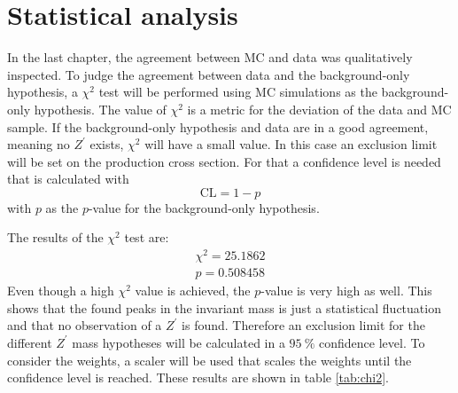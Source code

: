 \section{Statistical analysis}
In the last chapter, the agreement between MC and data was qualitatively inspected.
To judge the agreement between data and the background-only hypothesis, a $\chi^2$ test will be performed using MC simulations as the background-only hypothesis.
The value of $\chi^2$ is a metric for the deviation of the data and MC sample.
If the background-only hypothesis  and data are in a good agreement, meaning no $Z^\prime$ exists, $\chi^2$ will have a small value.
In this case an exclusion limit will be set on the production cross section.
For that a confidence level is needed that is calculated with
\begin{equation}
  \text{CL}= 1-p
\end{equation}
with $p$ as the $p$-value for the background-only hypothesis.

The results of the $\chi^2$ test are:
\begin{align*}
  \chi^2= 25.1862 \\
  p = 0.508458
\end{align*}
Even though a high $\chi^2$ value is achieved, the $p$-value is very high as well.
This shows that the found peaks in the invariant mass is just a statistical fluctuation and that no observation of a $Z^\prime$ is found.
Therefore an exclusion limit for the different $Z^\prime$ mass hypotheses will be calculated in a $\SI{95}{\percent}$ confidence level.
To consider the weights, a scaler will be used that scales the weights until the confidence level is reached.
These results are shown in table \ref{tab:chi2}.

